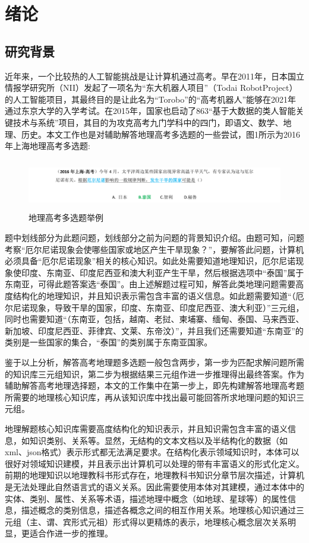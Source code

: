 \chapter{绪论}
\section{研究背景}
近年来，一个比较热的人工智能挑战是让计算机通过高考。早在2011年，日本国立情报学研究所（NII）发起了一项名为“东大机器人项目”（Todai RobotProject）的人工智能项目，其最终目的是让此名为“Torobo”的“高考机器人”能够在2021年通过东京大学的入学考试\cite{Fujita}。在2015年，国家也启动了863“基于大数据的类人智能关键技术与系统”项目，其目的为攻克高考九门学科中的四门，即语文、数学、地理、历史\cite{Cheng}。本文工作也是对辅助解答地理高考多选题的一些尝试，图1所示为2016年上海地理高考多选题:

\begin{figure}[!htb]
	\centering\includegraphics[height=2.2cm]{resource/ex_multi_choice_ques}
	\caption{地理高考多选题举例}
	\label{fig:ex_multi_choice_ques}
\end{figure}

题中划线部分为此题问题，划线部分之前为问题的背景知识介绍。由题可知，问题考察“厄尔尼诺现象会使哪些国家或地区产生干旱现象？”，要解答此问题，计算机必须具备“厄尔尼诺现象”相关的核心知识。如此处需要知道地理知识，厄尔尼诺现象使印度、东南亚、印度尼西亚和澳大利亚产生干旱，然后根据选项中“泰国”属于东南亚，可得此题答案选“泰国”。由上述解题过程可知，解答此类地理问题需要高度结构化的地理知识，并且知识表示需包含丰富的语义信息。如此题需要知道“（厄尔尼诺现象，导致干旱的国家，印度、东南亚、印度尼西亚、澳大利亚）”三元组，同时也需要知道“（东南亚，包括，越南、老挝、柬埔寨、缅甸、泰国、马来西亚、新加坡、印度尼西亚、菲律宾、文莱、东帝汶）”，并且我们还需要知道“东南亚”的类别是一些国家的集合，“泰国”的类别属于东南亚国家。

鉴于以上分析，解答高考地理题多选题一般包含两步，第一步为匹配求解问题所需的知识库三元组知识，第二步为根据结果三元组作进一步推理得出最终答案。作为辅助解答高考地理选择题，本文的工作集中在第一步上，即先构建解答地理高考题所需要的地理核心知识库，再从该知识库中找出最可能回答所求地理问题的知识三元组。

地理解题核心知识库需要高度结构化的知识表示，并且知识需包含丰富的语义信息，如知识类别、关系等。显然，无结构的文本文档以及半结构化的数据（如xml、json格式）表示形式都无法满足要求。在结构化表示领域知识时，本体可以很好对领域知识建模，并且表示出计算机可以处理的带有丰富语义的形式化定义\cite{Hitzler}。前期的地理知识以地理教科书形式存在，地理教科书知识分章节层次描述，计算机是无法处理此自然语言式的语义关系。因此需要使用本体对其建模，通过本体中的实体、类别、属性、关系等术语，描述地理中概念（如地球、星球等）的属性信息，描述概念的类别信息，描述各概念之间的相互作用关系。地理核心知识通过三元组（主、谓、宾形式元祖）形式得以更精炼的表示，地理核心概念层次关系明显，更适合作进一步的推理。

